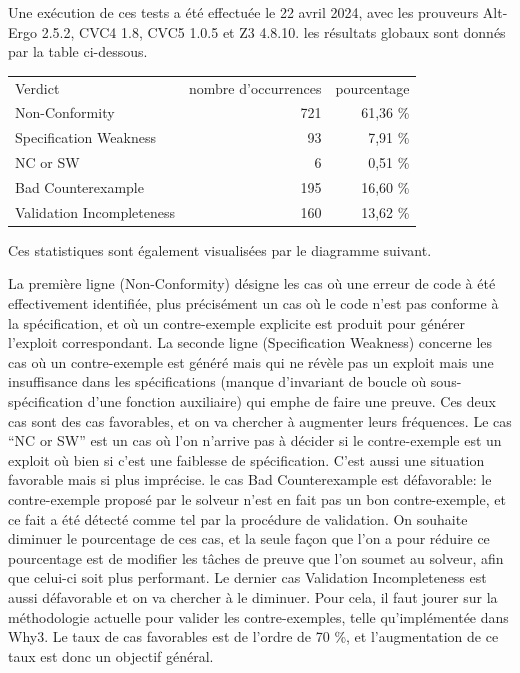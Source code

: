 \documentclass[a4paper,11pt]{article}
\begin{document}
Une exécution de ces tests a été effectuée
le 22 avril 2024, avec les prouveurs Alt-Ergo 2.5.2, CVC4 1.8, CVC5
1.0.5 et Z3 4.8.10. les résultats globaux sont donnés par la table ci-dessous.
  \begin{center}
  \begin{tabular}{|l|r|r|}
  \rowcolor{gray!50} Verdict
  & \multicolumn{1}{p{0.13\textwidth}|}{nombre d'occurrences}
  & \multicolumn{1}{p{0.13\textwidth}|}{pourcentage}
  \\
Non-Conformity         & 721 & 61,36 \% \\
Specification Weakness & 93 & 7,91 \% \\
    NC or SW  	       & 6 & 0,51 \% \\
Bad Counterexample & 195 & 16,60 \% \\
    Validation Incompleteness & 160 & 13,62 \%
  \end{tabular}
\end{center}
Ces statistiques sont également visualisées par le diagramme
  suivant.
  \begin{center}
\end{center}
La première ligne (Non-Conformity) désigne les cas où une erreur de
code à été effectivement identifiée, plus précisément un cas où le
code n'est pas conforme à la spécification, et où un contre-exemple
explicite est produit pour générer l'exploit correspondant. La seconde
ligne (Specification Weakness) concerne les cas où un contre-exemple
est généré mais qui ne révèle pas un exploit mais une insuffisance
dans les spécifications (manque d'invariant de boucle où
sous-spécification d'une fonction auxiliaire) qui emphe de faire une
preuve. Ces deux cas sont des cas favorables, et on va chercher à
augmenter leurs fréquences. Le cas ``NC or SW'' est un cas où l'on
n'arrive pas à décider si le contre-exemple est un exploit où bien si
c'est une faiblesse de spécification. C'est aussi une situation
favorable mais si plus imprécise. le cas Bad Counterexample est
défavorable: le contre-exemple proposé par le solveur n'est en fait
pas un bon contre-exemple, et ce fait a été détecté comme tel par la
procédure de validation. On souhaite diminuer le pourcentage de ces
cas, et la seule façon que l'on a pour réduire ce pourcentage est de
modifier les tâches de preuve que l'on soumet au solveur, afin que
celui-ci soit plus performant. Le dernier cas Validation
Incompleteness est aussi défavorable et on va chercher à le
diminuer. Pour cela, il faut jourer sur la méthodologie actuelle pour
valider les contre-exemples, telle qu'implémentée dans Why3.  Le taux
de cas favorables est de l'ordre de 70 \%, et l'augmentation de ce
taux est donc un objectif général.
\end{document}
